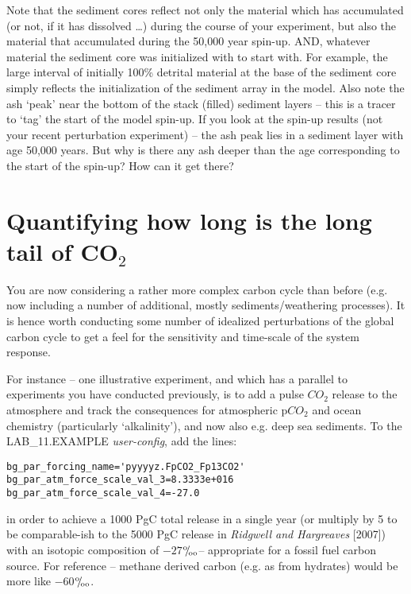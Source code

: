 \documentclass[11pt,fleqn]{book} %
\def\permille{\ensuremath{{}^\text{o}\mkern-5mu/\mkern-3mu_\text{oo}}}
\begin{document}
Note that the sediment cores reflect not only the material which has accumulated (or not, if it has dissolved …) during the course of your experiment, but also the material that accumulated during the 50,000 year spin-up. AND, whatever material the sediment core was initialized with to start with. For example, the large interval of initially 100\% detrital material at the base of the sediment core  simply reflects the initialization of the sediment array in the model. Also note the ash ‘peak’ near the bottom of the stack (filled) sediment layers – this is a tracer to ‘tag’ the start of the model spin-up. If you look at the spin-up results (not your recent perturbation experiment) – the ash peak lies in a sediment layer with age 50,000 years. But why is there any ash deeper than the age corresponding to the start of the spin-up? How can it get there?


\newpage


\section{Quantifying how long is the long tail of CO$_{2}$}

You are now considering a rather more complex carbon cycle than before (e.g. now including a number of additional, mostly sediments/weathering processes). It is hence worth conducting some number of idealized perturbations of the global carbon cycle to get a feel for the sensitivity and time-scale of the system response.

For instance – one illustrative experiment, and which has a parallel to experiments you have conducted previously, is to add a pulse \(CO_{2}\) release to the atmosphere and track the consequences for atmospheric p\(CO_{2}\) and ocean chemistry (particularly ‘alkalinity’), and now also e.g. deep sea sediments. To the \textsf{\footnotesize LAB\_11.EXAMPLE} \textit{user-config}, add the lines:
\vspace{-1mm}\small\begin{verbatim}
bg_par_forcing_name='pyyyyz.FpCO2_Fp13CO2'
bg_par_atm_force_scale_val_3=8.3333e+016
bg_par_atm_force_scale_val_4=-27.0
\end{verbatim}\normalsize\vspace{-1mm}
in order to achieve a 1000 PgC total release in a single year (or multiply by 5 to be comparable-ish to the 5000 PgC release in \textit{Ridgwell and Hargreaves} [2007]) with an isotopic composition of \(-27\)\permille -- appropriate for a fossil fuel carbon source. For reference -- methane derived carbon (e.g. as from hydrates) would be more like  \(-60\)\permille.
\end{document}
